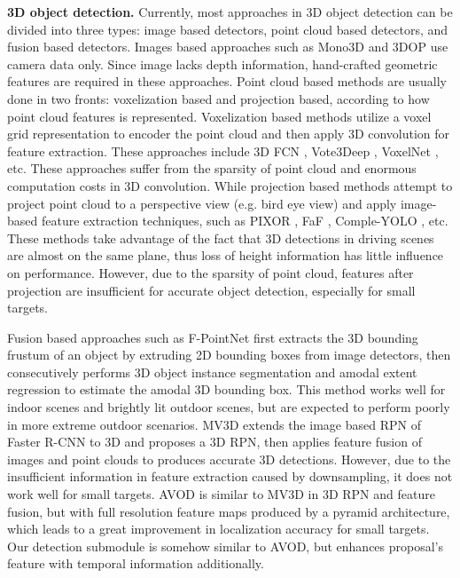 \documentclass[letterpaper, 10 pt, conference]{ieeeconf}  %
\begin{document}
\textbf{3D object detection.} Currently, most approaches in 3D object detection can be divided into three types: image based detectors, point cloud based detectors, and fusion based detectors. Images based approaches such as Mono3D \cite{7780605} and 3DOP \cite{chen20183d} use camera data only. Since image lacks depth information, hand-crafted geometric features are required in these approaches. Point cloud based methods are usually done in two fronts: voxelization based and projection based, according to how point cloud features is represented. Voxelization based methods utilize a voxel grid representation to encoder the point cloud and then apply 3D convolution for feature extraction. These approaches include 3D FCN \cite{li20173d}, Vote3Deep \cite{engelcke2017vote3deep}, VoxelNet \cite{zhou2018voxelnet}, etc. These approaches suffer from the sparsity of point cloud and enormous computation costs in 3D convolution. While projection based methods attempt to project point cloud to a perspective view (e.g. bird eye view) and apply image-based feature extraction techniques, such as PIXOR \cite{yang2018pixor}, FaF \cite{luo2018fast}, Comple-YOLO \cite{simon2018complex}, etc. These methods take advantage of the fact that 3D detections in driving scenes are almost on the same plane, thus loss of height information has little influence on performance. However, due to the sparsity of point cloud, features after projection are insufficient for accurate object detection, especially for small targets. 

Fusion based approaches such as F-PointNet \cite{qi2018frustum} first extracts the 3D bounding frustum of an object by extruding 2D bounding boxes from image detectors, then consecutively performs 3D object instance segmentation and amodal extent regression to estimate the amodal 3D bounding box. This method works well for indoor scenes and brightly lit outdoor scenes, but are expected to perform poorly in more extreme outdoor scenarios. MV3D \cite{chen2017multi} extends the image based RPN of Faster R-CNN\cite{ren2015faster} to 3D and proposes a 3D RPN, then applies feature fusion of images and point clouds to produces accurate 3D detections. However, due to the insufficient information in feature extraction caused by downsampling, it does not work well for small targets. AVOD \cite{ku2018joint} is similar to MV3D in 3D RPN and feature fusion, but with  full resolution feature maps produced by a pyramid architecture, which leads to a great improvement in localization accuracy for small targets. Our detection submodule is somehow similar to AVOD, but enhances proposal's feature with temporal information additionally.
\end{document}
